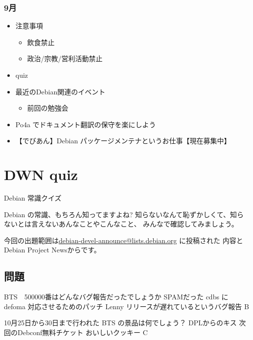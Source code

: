 \documentclass[cjk,dvipdfmx,12pt]{beamer}
\begin{document}
\begin{frame}
 \frametitle{9月}
\begin{minipage}[t]{0.45\hsize}
  \begin{itemize}
  \item 注意事項
	\begin{itemize}
	 \item 飲食禁止
	 \item 政治/宗教/営利活動禁止
	\end{itemize}
  \item quiz
  \item 最近のDebian関連のイベント
	\begin{itemize}
	 \item 前回の勉強会 
	\end{itemize}
 \end{itemize}
\end{minipage} 
\begin{minipage}[t]{0.45\hsize}
 \begin{itemize}
  \item Po4a でドキュメント翻訳の保守を楽にしよう
  \item 【でびあん】Debian パッケージメンテナというお仕事【現在募集中】
 \end{itemize}
\end{minipage}
\end{frame}


\section{DWN quiz}
\begin{frame}{Debian 常識クイズ}

Debian の常識、もちろん知ってますよね?
知らないなんて恥ずかしくて、知らないとは言えないあんなことやこんなこと、
みんなで確認してみましょう。

今回の出題範囲は\url{debian-devel-announce@lists.debian.org} に投稿された
内容とDebian Project Newsからです。

\end{frame}

\subsection{問題}


 \santaku
 {BTS　500000番はどんなバグ報告だったでしょうか}
 {SPAMだった}
 {cdbs に defoma 対応させるためのパッチ}
 {Lenny リリースが遅れているというバグ報告}
 {B}

 \santaku
 {10月25日から30日まで行われた BTS の景品は何でしょう？}
 {DPLからのキス}
 {次回のDebconf無料チケット}
 {おいしいクッキー}
 {C}
 
\end{document}
